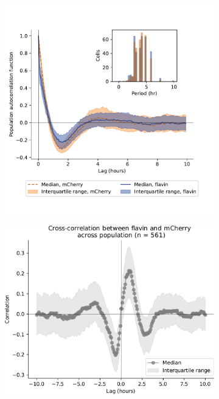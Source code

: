 \begin{figure}
\begin{subfigure}[htpb]{1.0\textwidth}
  \end{subfigure}
  \begin{subfigure}[t]{0.45\textwidth}
   \centering
   \includegraphics[width=\textwidth]{htb2mCherry_31594_12.pdf}
   \caption{
   }
   \label{fig:biology-pyruvate-acf}
  \end{subfigure}%
  \begin{subfigure}[t]{0.45\textwidth}
   \centering
   \includegraphics[width=\textwidth]{pyruvate_xcf_edit.pdf}
   \caption{
   }
   \label{fig:biology-pyruvate-xcf}
  \end{subfigure}


\end{figure}
